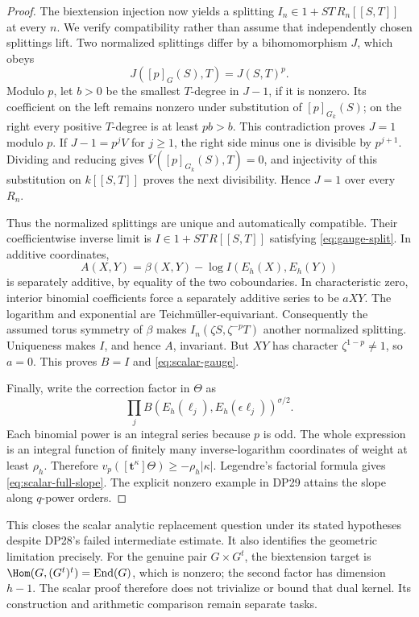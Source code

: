 \documentclass[11pt,a4paper]{article}
\theoremstyle{definition}\newtheorem{remark}[theorem]{Remark}
\begin{document}
\begin{proof}
The biextension injection now yields a splitting $I_n\in1+ST\,R_n[[S,T]]$ at every $n$. We verify compatibility rather than assume that independently chosen splittings lift. Two normalized splittings differ by a bihomomorphism $J$, which obeys
\[
 J([p]_G(S),T)=J(S,T)^p.
\]
Modulo $p$, let $b>0$ be the smallest $T$-degree in $J-1$, if it is nonzero. Its coefficient on the left remains nonzero under substitution of $[p]_{G_k}(S)$; on the right every positive $T$-degree is at least $pb>b$. This contradiction proves $J=1$ modulo $p$. If $J-1=p^jV$ for $j\ge1$, the right side minus one is divisible by $p^{j+1}$. Dividing and reducing gives $\bar V([p]_{G_k}(S),T)=0$, and injectivity of this substitution on $k[[S,T]]$ proves the next divisibility. Hence $J=1$ over every $R_n$.

Thus the normalized splittings are unique and automatically compatible. Their coefficientwise inverse limit is $I\in1+ST\,R[[S,T]]$ satisfying \eqref{eq:gauge-split}. In additive coordinates,
\[
 A(X,Y)=\beta(X,Y)-\log I(E_h(X),E_h(Y))
\]
is separately additive, by equality of the two coboundaries. In characteristic zero, interior binomial coefficients force a separately additive series to be $aXY$. The logarithm and exponential are Teichm\"uller-equivariant. Consequently the assumed torus symmetry of $\beta$ makes $I_n(\zeta S,\zeta^{-p}T)$ another normalized splitting. Uniqueness makes $I$, and hence $A$, invariant. But $XY$ has character $\zeta^{1-p}\ne1$, so $a=0$. This proves $B=I$ and \eqref{eq:scalar-gauge}.

Finally, write the correction factor in $\Theta$ as
\[
 \prod_j B(E_h(\ell_j),E_h(\epsilon\ell_j))^{\sigma/2}.
\]
Each binomial power is an integral series because $p$ is odd. The whole expression is an integral function of finitely many inverse-logarithm coordinates of weight at least $\rho_h$. Therefore $v_p([\mathbf t^\kappa]\Theta)\ge-\rho_h|\kappa|$. Legendre's factorial formula gives \eqref{eq:scalar-full-slope}. The explicit nonzero example in DP29 attains the slope along $q$-power orders.
\end{proof}

This closes the scalar analytic replacement question under its stated hypotheses despite DP28's failed intermediate estimate. It also identifies the geometric limitation precisely. For the genuine pair $G\times G^t$, the biextension target is $\Hom(G,(G^t)^t)=\operatorname{End}(G)$, which is nonzero; the second factor has dimension $h-1$. The scalar proof therefore does not trivialize or bound that dual kernel. Its construction and arithmetic comparison remain separate tasks.
\end{document}
